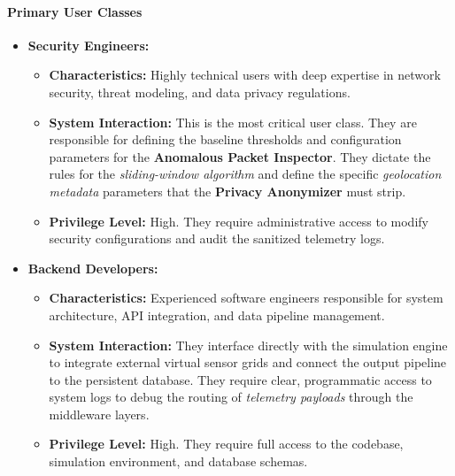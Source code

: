 \documentclass[12pt,letterpaper]{article}
\begin{document}
\paragraph{Primary User Classes}
\begin{itemize}
\item \textbf{Security Engineers:}
\begin{itemize}
\item \textbf{Characteristics:} Highly technical users with deep expertise in network security, threat modeling, and data privacy regulations.
\item \textbf{System Interaction:} This is the most critical user class. They are responsible for defining the baseline thresholds and configuration parameters for the \textbf{Anomalous Packet Inspector}. They dictate the rules for the \emph{sliding-window algorithm} and define the specific \emph{geolocation metadata} parameters that the \textbf{Privacy Anonymizer} must strip.
\item \textbf{Privilege Level:} High. They require administrative access to modify security configurations and audit the sanitized telemetry logs.
\end{itemize}
\item \textbf{Backend Developers:}
\begin{itemize}
\item \textbf{Characteristics:} Experienced software engineers responsible for system architecture, API integration, and data pipeline management.
\item \textbf{System Interaction:} They interface directly with the simulation engine to integrate external virtual sensor grids and connect the output pipeline to the persistent database. They require clear, programmatic access to system logs to debug the routing of \emph{telemetry payloads} through the middleware layers.
\item \textbf{Privilege Level:} High. They require full access to the codebase, simulation environment, and database schemas.
\end{itemize}
\end{itemize}
\end{document}
